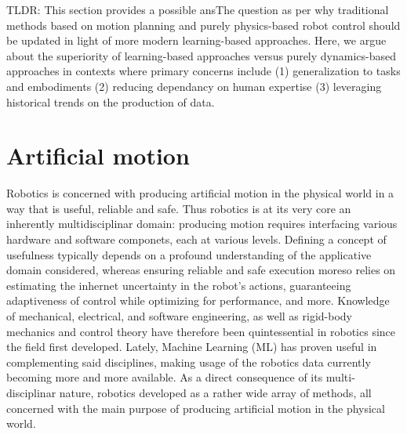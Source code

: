 TLDR:
This section provides a possible ansThe question as per why traditional methods based on motion planning and purely physics-based robot control should be updated in light of more modern learning-based approaches. 
Here, we argue about the superiority of learning-based approaches versus purely dynamics-based approaches in contexts where primary concerns include (1) generalization to tasks and embodiments (2) reducing dependancy on human expertise (3) leveraging historical trends on the production of data.

\section{Artificial motion}
\label{sec:classical}

Robotics is concerned with producing artificial motion in the physical world in a way that is useful, reliable and safe.
Thus robotics is at its very core an inherently multidisciplinar domain: producing motion requires interfacing various hardware and software componets, each at various levels.
Defining a concept of usefulness typically depends on a profound understanding of the applicative domain considered, whereas ensuring reliable and safe execution moreso relies on estimating the inhernet uncertainty in the robot's actions, guaranteeing adaptiveness of control while optimizing for performance, and more.
Knowledge of mechanical, electrical, and software engineering, as well as rigid-body mechanics and control theory have therefore been quintessential in robotics since the field first developed.
Lately, Machine Learning (ML) has proven useful in complementing said disciplines, making usage of the robotics data currently becoming more and more available.
As a direct consequence of its multi-disciplinar nature, robotics developed as a rather wide array of methods, all concerned with the main purpose of producing artificial motion in the physical world.

